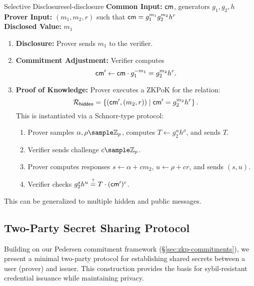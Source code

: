 \begin{protocol}{Selective Disclosure}{sel-disclosure}
\textbf{Common Input:} \(\mathsf{cm}\), generators \(g_1, g_2, h\)\\
\textbf{Prover Input:} \((m_1, m_2, r)\) such that \(\mathsf{cm} = g_1^{m_1} g_2^{m_2} h^r\)\\
\textbf{Disclosed Value:} \(m_1\)
\begin{enumerate}
    \item \textbf{Disclosure:} Prover sends \(m_1\) to the verifier.
    \item \textbf{Commitment Adjustment:} Verifier computes 
    \[
    \mathsf{cm}' \gets \mathsf{cm} \cdot g_1^{-m_1} = g_2^{m_2} h^r.
    \]
    \item \textbf{Proof of Knowledge:} Prover executes a ZKPoK for the relation:
    \[
    \mathcal{R}_{\mathsf{hidden}} = \left\{ (\mathsf{cm}', (m_2, r)) \;|\; \mathsf{cm}' = g_2^{m_2} h^r \right\}.
    \]
    This is instantiated via a Schnorr-type protocol:
    \begin{enumerate}
        \item Prover samples \(\alpha, \rho \sample \Z_p\), computes \(T \gets g_2^{\alpha} h^{\rho}\), and sends \(T\).
        \item Verifier sends challenge \(c \sample \Z_p\).
        \item Prover computes responses \(s \gets \alpha + c m_2\), \(u \gets \rho + c r\), and sends \((s, u)\).
        \item Verifier checks \(g_2^s h^u \stackrel{?}{=} T \cdot (\mathsf{cm}')^c\).
    \end{enumerate}
\end{enumerate}
\end{protocol}
This can be generalized to multiple hidden and public messages. 






\newpage
\subsection{Two-Party Secret Sharing Protocol}\label{pok-2party}

Building on our Pedersen commitment framework (\S\ref{sec:zkp-commitments}), we present a minimal two-party protocol for establishing shared secrets between a user (prover) and issuer. This construction provides the basis for sybil-resistant credential issuance while maintaining privacy.




